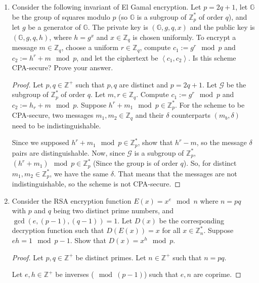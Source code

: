 \documentclass{article}
\begin{document}
\begin{enumerate}
  \item Consider the following invariant of El Gamal encryption. Let $p = 2q +
    1$, let $\mathbb{G}$ be the group of squares modulo $p$ (so $\mathbb{G}$
    is a subgroup of $\mathbb{Z}^{*}_p$ of order $q$), and let $g$ be a
    generator of $\mathbb{G}$. The private key is $(\mathbb{G}, g, q, x)$ and
    the public key is $(\mathbb{G}, g, q, h)$, where $h = g^x$ and $x \in
    \mathbb{Z}_q$ is chosen uniformly. To encrypt a message $m \in
    \mathbb{Z}_q$, choose a uniform $r \in \mathbb{Z}_q$, compute $c_1 := g^r
    \mod p$ and $c_2 := h^r + m \mod p$, and let the ciphertext be $\left<c_1,
    c_2\right>$. Is this scheme CPA-secure? Prove your answer.

    \begin{proof}
      Let $p, q \in \mathbb{Z}^{+}$ such that $p, q$ are distinct and $p = 2q +
      1$. Let $\mathcal{G}$ be the subgroup of $\mathbb{Z}_p^{*}$ of order $q$.
      Let $m, r \in \mathbb{Z}_q$. Compute $c_1 := g^r \mod{p}$ and $c_2 := h_r
      + m \mod p$. Suppose $h^r + m_1 \mod p \in \mathbb{Z}_p^{*}$. For the
      scheme to be CPA-secure, two messages $m_1, m_2 \in \mathbb{Z}_q$ and
      their $\delta$ counterparts $(m_b, \delta)$ need to be indistinguishable.

      Since we supposed $h^r + m_1 \mod p \in \mathbb{Z}_p^{*}$, show that $h^r
      - m$, so the message $\delta$ pairs are distinguishable. Now, since
      $\mathcal{G}$ is a subgroup of $\mathbb{Z}_p^{*}$, $(h^r + m_1) \mod p
      \in \mathbb{Z}_p^{*}$ (Since the group is of order $q$). So, for distinct
      $m_1, m_2 \in \mathbb{Z}_p^{*}$, we have the same $\delta$. That means
      that the messages are not indistinguishable, so the scheme is not
      CPA-secure.
    \end{proof}

  \item Consider the RSA encryption function $E(x) = x^e \mod n$ where $n = pq$
    with $p$ and $q$ being two distinct prime numbers, and $\gcd(e, (p - 1), (q
    - 1)) = 1$. Let $D(x)$ be the corresponding decryption function such that
    $D(E(x)) = x$ for all $x \in \mathbb{Z}^{*}_n$. Suppose $eh = 1 \mod p - 1$.
    Show that $D(x) = x^h \mod p$.

    \begin{proof}
      Let $p, q \in \mathbb{Z}^{+}$ be distinct primes. Let $n \in
      \mathbb{Z}^{+}$ such that $n = pq$.

      Let $e, h \in \mathbb{Z}^{+}$ be inverses ($\mod (p - 1)$) such that $e,
      n$ are coprime.


\end{proof}
\end{enumerate}
\end{document}

